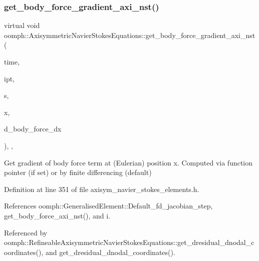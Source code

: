 \mbox{\label{classoomph_1_1AxisymmetricNavierStokesEquations_ab4a21f4cfb33ae0561d572126d672964}} 
\subsubsection{\texorpdfstring{get\+\_\+body\+\_\+force\+\_\+gradient\+\_\+axi\+\_\+nst()}{get\_body\_force\_gradient\_axi\_nst()}}
{\footnotesize\ttfamily virtual void oomph\+::\+Axisymmetric\+Navier\+Stokes\+Equations\+::get\+\_\+body\+\_\+force\+\_\+gradient\+\_\+axi\+\_\+nst (\begin{DoxyParamCaption}\item[{const double \&}]{time,  }\item[{const unsigned \&}]{ipt,  }\item[{const \hyperlink{classoomph_1_1Vector}{Vector}$<$ double $>$ \&}]{s,  }\item[{const \hyperlink{classoomph_1_1Vector}{Vector}$<$ double $>$ \&}]{x,  }\item[{\hyperlink{classoomph_1_1DenseMatrix}{Dense\+Matrix}$<$ double $>$ \&}]{d\+\_\+body\+\_\+force\+\_\+dx }\end{DoxyParamCaption})\hspace{0.3cm}{\ttfamily [inline]}, {\ttfamily [protected]}, {\ttfamily [virtual]}}



Get gradient of body force term at (Eulerian) position x. Computed via function pointer (if set) or by finite differencing (default) 



Definition at line 351 of file axisym\+\_\+navier\+\_\+stokes\+\_\+elements.\+h.



References oomph\+::\+Generalised\+Element\+::\+Default\+\_\+fd\+\_\+jacobian\+\_\+step, get\+\_\+body\+\_\+force\+\_\+axi\+\_\+nst(), and i.



Referenced by oomph\+::\+Refineable\+Axisymmetric\+Navier\+Stokes\+Equations\+::get\+\_\+dresidual\+\_\+dnodal\+\_\+coordinates(), and get\+\_\+dresidual\+\_\+dnodal\+\_\+coordinates().

